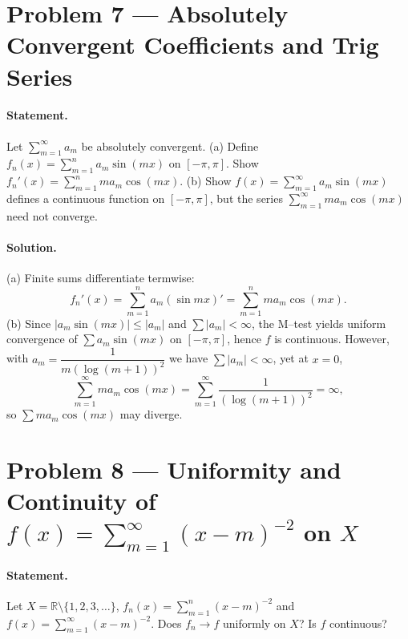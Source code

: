 \documentclass[12pt,a4paper]{article}
\theoremstyle{plain}
\theoremstyle{definition}
\theoremstyle{remark}
\theoremstyle{remark}
\begin{document}
	
\section*{Problem 7 — Absolutely Convergent Coefficients and Trig Series}

\paragraph{Statement.}
Let $\sum_{m=1}^\infty a_m$ be absolutely convergent.
(a) Define $f_n(x)=\sum_{m=1}^n a_m\sin(mx)$ on $[-\pi,\pi]$. Show $f_n'(x)=\sum_{m=1}^n m a_m\cos(mx)$.
(b) Show $f(x)=\sum_{m=1}^\infty a_m\sin(mx)$ defines a continuous function on $[-\pi,\pi]$, but the series
$\sum_{m=1}^\infty m a_m\cos(mx)$ need not converge.

\paragraph{Solution.}
(a) Finite sums differentiate termwise:
\[
f_n'(x)=\sum_{m=1}^n a_m(\sin mx)' = \sum_{m=1}^n m a_m\cos(mx).
\]
(b) Since $|a_m\sin(mx)|\le|a_m|$ and $\sum|a_m|<\infty$, the M–test yields uniform convergence of
$\sum a_m\sin(mx)$ on $[-\pi,\pi]$, hence $f$ is continuous.
However, with $a_m=\dfrac{1}{m(\log(m+1))^2}$ we have $\sum|a_m|<\infty$, yet at $x=0$,
\[
\sum_{m=1}^\infty m a_m\cos(mx)=\sum_{m=1}^\infty \frac{1}{(\log(m+1))^2}=\infty,
\]
so $\sum m a_m\cos(mx)$ may diverge.

\bigskip
\section*{Problem 8 — Uniformity and Continuity of $\displaystyle f(x)=\sum_{m=1}^\infty (x-m)^{-2}$ on $X$}

\paragraph{Statement.}
Let $X=\mathbb R\setminus\{1,2,3,\dots\}$, $f_n(x)=\sum_{m=1}^n (x-m)^{-2}$ and $f(x)=\sum_{m=1}^\infty (x-m)^{-2}$.
Does $f_n\to f$ uniformly on $X$? Is $f$ continuous?
\end{document}
